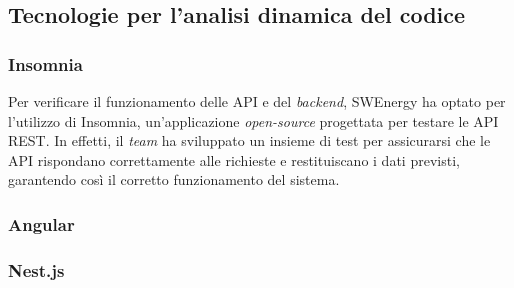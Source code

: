 \subsection{Tecnologie per l'analisi dinamica del codice}

\subsubsection{Insomnia}

Per verificare il funzionamento delle API e del \textit{backend}, SWEnergy ha
optato per l'utilizzo di Insomnia, un'applicazione \textit{open-source} progettata per
testare le API REST. In effetti, il \textit{team} ha sviluppato un insieme di test per
assicurarsi che le API rispondano correttamente alle richieste e restituiscano i
dati previsti, garantendo così il corretto funzionamento del sistema.


\subsubsection{Angular}

\subsubsection{Nest.js}

